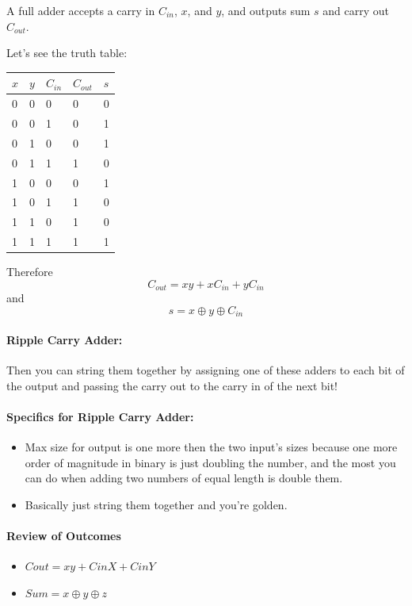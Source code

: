 \documentclass[a4paper,12pt]{report}
\begin{document}
A full adder accepts a carry in $C_{in}$, $x$, and $y$, and outputs sum $s$ and carry out $C_{out}$.

Let's see the truth table:
\begin{tabular}{lll|ll}
$x$ & $y$ & $C_{in}$ & $C_{out}$ & $s$ \\
\hline
0 & 0 & 0 & 0 & 0 \\
0 & 0 & 1 & 0 & 1 \\
0 & 1 & 0 & 0 & 1 \\
0 & 1 & 1 & 1 & 0 \\
1 & 0 & 0 & 0 & 1 \\
1 & 0 & 1 & 1 & 0 \\
1 & 1 & 0 & 1 & 0 \\
1 & 1 & 1 & 1 & 1 \\
\end{tabular}

Therefore $$C_{out} = xy + xC_{in} + yC_{in}$$
and $$s = x \oplus y \oplus C_{in}$$

\paragraph{Ripple Carry Adder: } Then you can string them together by assigning one of these 
adders to each bit of the output and passing the carry out to the carry in of the next bit!

\paragraph{Specifics for Ripple Carry Adder: }
\begin{itemize}
\item Max size for output is one more then the two input's sizes because one more order of 
magnitude in binary is just doubling the number, and the most you can do when adding two 
numbers of equal length is double them.
\item Basically just string them together and you're golden.
\end{itemize}

\paragraph{Review of Outcomes}
\begin{itemize}
\item $Cout = xy + CinX + CinY$
\item $Sum = x \oplus y \oplus z$
\end{itemize}
\end{document}
